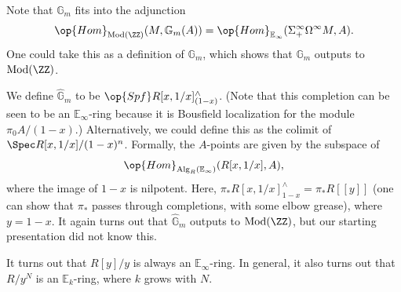 \documentclass[../notes.tex]{subfiles}
\begin{document}
\begin{remark}
	Note that $\mathbb G_m$ fits into the adjunction
	\[\op{Hom}_{\mathrm{Mod}(\ZZ)}(M,\mathbb G_m(A))=\op{Hom}_{\mathbb E_\infty}(\Sigma_+^\infty\Omega^\infty M,A).\]
	One could take this as a definition of $\mathbb G_m$, which shows that $\mathbb G_m$ outputs to $\mathrm{Mod}(\ZZ)$.
\end{remark}
\begin{example}
	We define $\widehat{\mathbb G}_m$ to be $\op{Spf}R[x,1/x]^\land_{(1-x)}$. (Note that this completion can be seen to be an $\mathbb E_\infty$-ring because it is Bousfield localization for the module $\pi_0A/(1-x)$.) Alternatively, we could define this as the colimit of $\Spec R[x,1/x]/(1-x)^n$. Formally, the $A$-points are given by the subspace of
	\[\op{Hom}_{\mathrm{Alg}_R(\mathbb E_\infty)}(R[x,1/x],A),\]
	where the image of $1-x$ is nilpotent. Here, $\pi_*R[x,1/x]^\land_{1-x}=\pi_*R[[y]]$ (one can show that $\pi_*$ passes through completions, with some elbow grease), where $y=1-x$. It again turns out that $\widehat{\mathbb G}_m$ outputs to $\mathrm{Mod}(\ZZ)$, but our starting presentation did not know this.
\end{example}
\begin{remark}
	It turns out that $R[y]/y$ is always an $\mathbb E_\infty$-ring. In general, it also turns out that $R/y^N$ is an $\mathbb E_k$-ring, where $k$ grows with $N$.
\end{remark}
\end{document}
